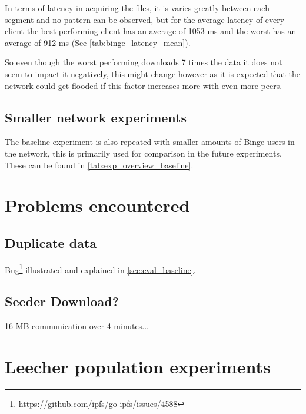 

In terms of latency in acquiring the files, it is varies greatly between each segment and no pattern can be observed, but for the average latency of every client the best performing client has an average of 1053 \acs{ms} and the worst has an average of 912 \acs{ms} (See \autoref{tab:binge_latency_mean}).



So even though the worst performing downloads 7 times the data it does not seem to impact it negatively, this might change however as it is expected that the network could get flooded if this factor increases more with even more peers.

\subsection{Smaller network experiments}
The baseline experiment is also repeated with smaller amounts of Binge users in the network, this is primarily used for comparison in the future experiments. These can be found in \autoref{tab:exp_overview_baseline}.


\section{Problems encountered}
\subsection{Duplicate data}
Bug\footnote{\url{https://github.com/ipfs/go-ipfs/issues/4588}} illustrated and explained in \autoref{sec:eval_baseline}.

\subsection{Seeder Download?}
16 \ac{MB} communication over 4 minutes...


\section{Leecher population experiments}
\label{sec:eval_leecher}

